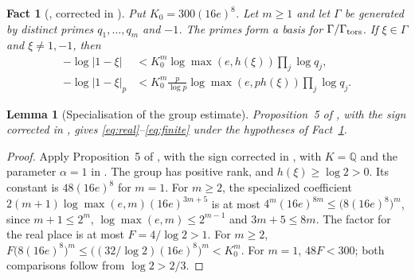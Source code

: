 \documentclass{amsart}
\newtheorem{lemma}{Lemma}[section]
\newtheorem{fact}{Fact}
\theoremstyle{remark}
\newcommand{\Q}{\mathbb Q}
\numberwithin{equation}{section}
\begin{document}
\begin{fact}[{\cite[Proposition~5, p.~517]{Gyory2019}, corrected in
\cite{Gyory2020}}]\label{fact:group}
Put $K_0=300(16e)^8$.
Let $m\ge1$ and let $\Gamma$ be generated by distinct primes
$q_1,\ldots,q_m$ and $-1$.
The primes form a basis for $\Gamma/\Gamma_{\rm tors}$.
If $\xi\in\Gamma$ and $\xi\ne1,-1$, then
\begin{align}
-\log|1-\xi|&<K_0^m\log\max(e,h(\xi))\prod_j\log q_j,\label{eq:real}\\
-\log|1-\xi|_p&<K_0^m\frac p{\log p}
 \log\max(e,ph(\xi))\prod_j\log q_j.\label{eq:finite}
\end{align}
\end{fact}
\begin{lemma}[Specialisation of the group estimate]\label{lem:group-specialisation}
Proposition~5 of \cite{Gyory2019}, with the sign corrected in \cite{Gyory2020},
gives \eqref{eq:real}--\eqref{eq:finite}
under the hypotheses of Fact~\ref{fact:group}.
\end{lemma}
\begin{proof}
Apply Proposition~5 of \cite{Gyory2019}, with the sign corrected in \cite{Gyory2020},
with $K=\Q$ and the parameter $\alpha=1$ in \cite{Gyory2019}.
The group has positive rank, and $h(\xi)\ge\log2>0$.
Its constant is $48(16e)^8$ for $m=1$.
For $m\ge2$, the specialized coefficient
$2(m+1)\log\max(e,m)(16e)^{3m+5}$ is at most
$4^m(16e)^{8m}\le\bigl(8(16e)^8\bigr)^m$, since
$m+1\le2^m$, $\log\max(e,m)\le2^{m-1}$ and $3m+5\le8m$.
The factor for the real place is at most $F=4/\log2>1$.
For $m\ge2$, $F\bigl(8(16e)^8\bigr)^m
\le\bigl((32/\log2)(16e)^8\bigr)^m<K_0^m$.
For $m=1$, $48F<300$; both comparisons follow from $\log2>2/3$.
\end{proof}
\end{document}
